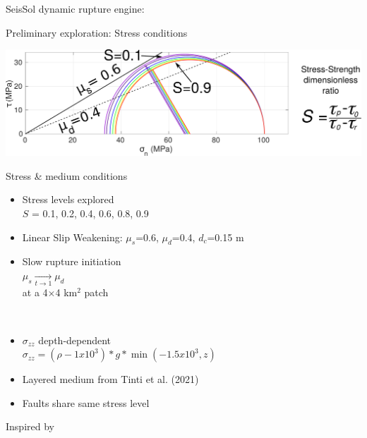 \documentclass{beamer}
\begin{document}
\begin{frame}
 
 
 \huge \center SeisSol dynamic rupture engine:
 
\end{frame}


\begin{frame}
 {Preliminary exploration: Stress conditions}
 
 \begin{center}
  \includegraphics[width=0.9\linewidth]{images/MC_circle_2.pdf}
 \end{center}
  \centering \vskip -0.4cm Stress \& medium conditions \\
  \vskip 0.3cm
 \begin{minipage}{0.5\linewidth}
 \begin{itemize}
  \small \item \small Stress levels explored \\
  \small $S$ = 0.1, 0.2, 0.4, 0.6, 0.8, 0.9 \pause
  \vskip 0.2cm
  \item \small Linear Slip Weakening: $\mu_s$=0.6, 
  $\mu_d$=0.4, $d_c$=0.15 m \pause
  \vskip 0.2cm
  \item \small Slow rupture initiation \\ \hskip 0.5cm $\mu_s \xrightarrow[t \to 1] \ \mu_d$  \\ at a 4$\times$4 km$^2$ patch \pause
 \end{itemize}
 \end{minipage}
 \begin{minipage}{0.48\linewidth} \,
 \begin{itemize}
  \item \small $\sigma_{zz}$ depth-dependent \\ 
  {\tiny $\sigma_{zz} = (\rho - 1x10^3)*g*\min(-1.5x10^3, z)$}\pause
  \vskip 0.2cm
  \item \small Layered medium from Tinti et al. (2021) \pause
  \vskip 0.2cm
  \item \small Faults share same stress level
 \end{itemize}
 \end{minipage}

 \hfill {\tiny Inspired by \cite{Aochi_2018_DAN}}
 
\end{frame}
\end{document}
